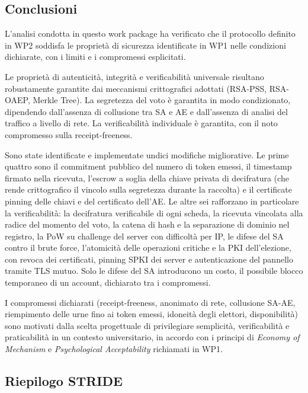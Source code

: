 \documentclass[12pt,a4paper]{article}
\begin{document}
\subsection{Conclusioni}

L'analisi condotta in questo work package ha verificato che il protocollo definito in WP2 soddisfa le proprietà di sicurezza identificate in WP1 nelle condizioni dichiarate, con i limiti e i compromessi esplicitati.

Le proprietà di autenticità, integrità e verificabilità universale risultano robustamente garantite dai meccanismi crittografici adottati (RSA-PSS, RSA-OAEP, Merkle Tree). La segretezza del voto è garantita in modo condizionato, dipendendo dall'assenza di collusione tra SA e AE e dall'assenza di analisi del traffico a livello di rete. La verificabilità individuale è garantita, con il noto compromesso sulla receipt-freeness.

Sono state identificate e implementate undici modifiche migliorative. Le prime quattro sono il commitment pubblico del numero di token emessi, il timestamp firmato nella ricevuta, l'escrow a soglia della chiave privata di decifratura (che rende crittografico il vincolo sulla segretezza durante la raccolta) e il certificate pinning delle chiavi e del certificato dell'AE. Le altre sei rafforzano in particolare la verificabilità: la decifratura verificabile di ogni scheda, la ricevuta vincolata alla radice del momento del voto, la catena di hash e la separazione di dominio nel registro, la PoW su challenge del server con difficoltà per IP, le difese del SA contro il brute force, l'atomicità delle operazioni critiche e la PKI dell'elezione, con revoca dei certificati, pinning SPKI dei server e autenticazione del pannello tramite TLS mutuo. Solo le difese del SA introducono un costo, il possibile blocco temporaneo di un account, dichiarato tra i compromessi.

I compromessi dichiarati (receipt-freeness, anonimato di rete, collusione SA-AE, riempimento delle urne fino ai token emessi, idoneità degli elettori, disponibilità) sono motivati dalla scelta progettuale di privilegiare semplicità, verificabilità e praticabilità in un contesto universitario, in accordo con i principi di \textit{Economy of Mechanism} e \textit{Psychological Acceptability} richiamati in WP1.

\subsection{Riepilogo STRIDE}
\end{document}
